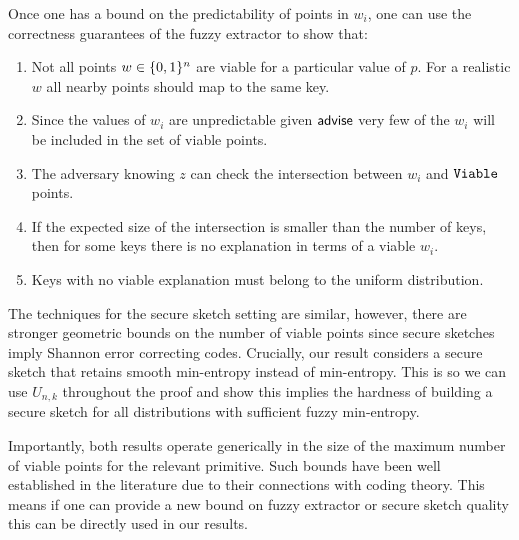 Once one has a bound on the predictability of points in $w_i$, one can use the correctness guarantees of the fuzzy extractor to show that:
\begin{enumerate}
\itemsep0em
\item Not all points $w\in\{0, 1\}^n$ are viable for a particular value of $p$.  For a realistic $w$ all nearby points should map to the same key.
\item Since the values of $w_i$ are unpredictable given ${\mathsf{advise}}$ very few of the $w_i$ will be included in the set of viable points.
\item The adversary knowing $z$ can check the intersection between $w_i$ and $\mathtt{Viable}$ points.  
\item If the expected size of the intersection is smaller than the number of keys, then for some keys there is no explanation in terms of a viable $w_i$.
\item Keys with no viable explanation must belong to the uniform distribution.
\end{enumerate}

The techniques for the secure sketch setting are similar, however, there are stronger geometric bounds on the number of viable points since secure sketches imply Shannon error correcting codes.  Crucially, our result considers a secure sketch that retains smooth min-entropy instead of min-entropy.  This is so we can use $U_{n,k}$ throughout the proof and show this implies the hardness of building a secure sketch for all distributions with sufficient fuzzy min-entropy.  


Importantly, both results operate generically in the size of the maximum number of viable points for the relevant primitive.  Such bounds have been well established in the literature due to their connections with coding theory.  This means if one can provide a new bound on fuzzy extractor or secure sketch quality this can be directly used in our results.

